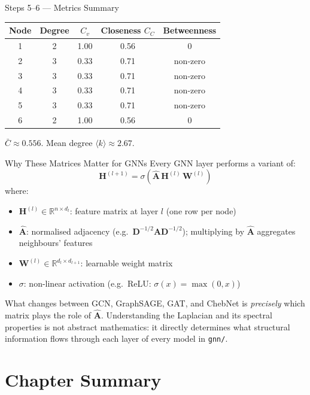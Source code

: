 \begin{examplebox}{Steps 5--6 --- Metrics Summary}
\begin{center}
\begin{tabular}{ccccc}
\toprule
Node & Degree & $C_v$ & Closeness $C_C$ & Betweenness \\
\midrule
1 & 2 & 1.00 & 0.56 & 0 \\
2 & 3 & 0.33 & 0.71 & non-zero \\
3 & 3 & 0.33 & 0.71 & non-zero \\
4 & 3 & 0.33 & 0.71 & non-zero \\
5 & 3 & 0.33 & 0.71 & non-zero \\
6 & 2 & 1.00 & 0.56 & 0 \\
\bottomrule
\end{tabular}
\end{center}
$\bar{C} \approx 0.556$. Mean degree $\langle k \rangle \approx 2.67$.
\end{examplebox}

\begin{keyinsight}{Why These Matrices Matter for GNNs}
Every GNN layer performs a variant of:
\[
\mathbf{H}^{(l+1)} = \sigma\!\left(\hat{\mathbf{A}}\,\mathbf{H}^{(l)}\,\mathbf{W}^{(l)}\right)
\]
where:
\begin{itemize}[noitemsep]
    \item $\mathbf{H}^{(l)} \in \mathbb{R}^{n \times d_l}$: feature matrix at layer $l$ (one row per node)
    \item $\hat{\mathbf{A}}$: normalised adjacency (e.g.\ $\mathbf{D}^{-1/2}\mathbf{A}\mathbf{D}^{-1/2}$); multiplying by $\hat{\mathbf{A}}$ aggregates neighbours' features
    \item $\mathbf{W}^{(l)} \in \mathbb{R}^{d_l \times d_{l+1}}$: learnable weight matrix
    \item $\sigma$: non-linear activation (e.g.\ ReLU: $\sigma(x) = \max(0,x)$)
\end{itemize}

What changes between GCN, GraphSAGE, GAT, and ChebNet is \emph{precisely} which matrix plays the role of $\hat{\mathbf{A}}$. Understanding the Laplacian and its spectral properties is not abstract mathematics: it directly determines what structural information flows through each layer of every model in \texttt{gnn/}.
\end{keyinsight}

\section{Chapter Summary}

